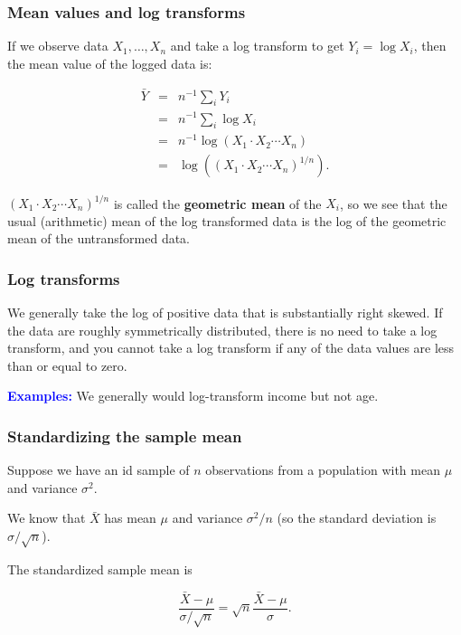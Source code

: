 \begin{frame}
\frametitle{Mean values and log transforms}

If we observe data $X_1, \ldots, X_n$ and take a log transform to get
$Y_i = \log X_i$, then the mean value of the logged data is:

\begin{eqnarray*}
\bar{Y} &=& n^{-1}\sum_i Y_i\\
       &=& n^{-1}\sum_i \log X_i\\
       &=& n^{-1}\log(X_1 \cdot X_2 \cdots X_n)\\
       &=& \log\left((X_1 \cdot X_2 \cdots X_n)^{1/n}\right).
\end{eqnarray*}

$(X_1 \cdot X_2 \cdots X_n)^{1/n}$ is called the {\bf geometric mean}
of the $X_i$, so we see that the usual (arithmetic) mean of the log
transformed data is the log of the geometric mean of the untransformed
data.

\end{frame}


\begin{frame}
\frametitle{Log transforms}

We generally take the log of positive data that is substantially right
skewed.  If the data are roughly symmetrically distributed, there is
no need to take a log transform, and you cannot take a log transform
if any of the data values are less than or equal to zero.

\textcolor{blue}{\bf Examples:} We generally would log-transform
income but not age.


\end{frame}



\begin{frame}
\frametitle{Standardizing the sample mean}

Suppose we have an id sample of $n$ observations from a population
with mean $\mu$ and variance $\sigma^2$.

We know that $\bar{X}$ has mean $\mu$ and variance $\sigma^2/n$ (so
the standard deviation is $\sigma/\sqrt{n}$).  

The standardized sample mean is

$$
\frac{\bar{X}-\mu}{\sigma/\sqrt{n}} = \sqrt{n}\frac{\bar{X}-\mu}{\sigma}.
$$

\end{frame}


